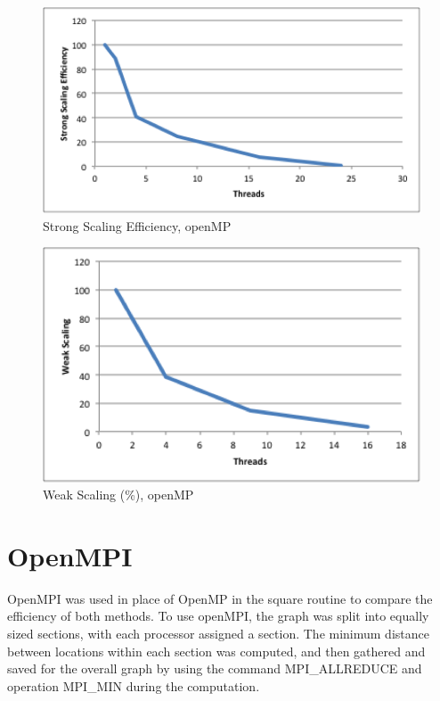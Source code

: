 \documentclass{article}
\begin{document}
	\begin{figure}[h!]
		\begin{center}
			\includegraphics[width=0.7\columnwidth]{st_graph_mp}
			\caption{Strong Scaling Efficiency, openMP}
			\label{mp_st_g}
		\end{center}
	\end{figure}
	
	\begin{figure}[h!]
		\begin{center}
			\includegraphics[width=0.7\columnwidth]{wk_graph_mp}
			\caption{Weak Scaling (\%), openMP}
			\label{wk_mp_g}
		\end{center}
	\end{figure}
	

\clearpage
\section{OpenMPI}

OpenMPI was used in place of OpenMP in the square routine to compare the efficiency of both methods. To use openMPI, the graph was split into equally sized sections, with each processor assigned a section. The minimum distance between locations within each section was computed, and then gathered and saved for the overall graph by using the command MPI\_ALLREDUCE and operation MPI\_MIN during the computation.  
\end{document}
